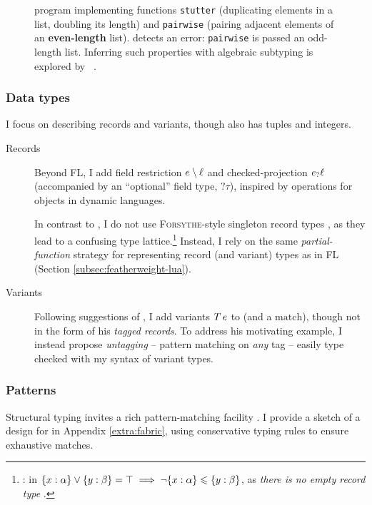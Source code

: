 \begin{figure}[p]
    \centering
    
    \caption{\fabric{} program implementing functions \texttt{stutter} (duplicating elements in a list, doubling its length) and \texttt{pairwise} (pairing adjacent elements of an \textbf{even-length} list). \inference{} detects an error: \texttt{pairwise} is passed an odd-length list. Inferring such properties with algebraic subtyping is explored by \citeauthor*{structural-refinement-types}~\cite{structural-refinement-types}.}
    \label{fig:fabric-example-pairwise}
\end{figure}

\subsubsection{Data types}

I focus on describing records and variants, though \fabric{} also has tuples and integers.
\begin{description}
\item[Records]
Beyond FL, I add field restriction $e \setminus \ell$ \cite{operations-on-records} and checked-projection ${e}_?{\ell}$ (accompanied by an \enquote{optional} field type, $?\boxed{\tau}$), inspired by operations for objects in dynamic languages.

In contrast to \textcite{mlstruct}, I do not use \textsc{Forsythe}-style singleton record types \cite{forsythe}, as they lead to a confusing type lattice.\footnote{\eg{}: in \mlstruct{} $\flrec{x : \alpha} \join \flrec{y: \beta} = \top \implies \comp \flrec{ x : \alpha } \sub \flrec{ y : \beta } $, as \emph{there is no empty record type} \cite[Section~4.4.5]{mlstruct}.} Instead, I rely on the same \emph{partial-function} strategy for representing record (and variant) types as in FL (Section \ref{subsec:featherweight-lua}).

\item[Variants] Following suggestions of \textcite[Section~9.2]{dolan-thesis}, I add variants $T\,e$ to \fabric{} (and a $\mathrm{match}$), though not in the form of his \emph{tagged records}. To address his motivating example, I instead propose \emph{untagging} -- pattern matching on \emph{any} tag -- easily type checked with my syntax of variant types.
\end{description}

\subsubsection{Patterns}
Structural typing invites a rich pattern-matching facility \cite{parreaux-patterns}. I provide a sketch of a design for \fabric{} in Appendix \ref{extra:fabric}, using conservative typing rules to ensure exhaustive matches. 

